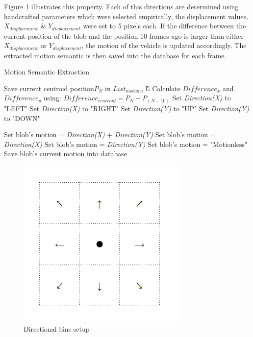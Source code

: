 Figure \ref{fig:cardinalbins} illustrates this property. Each of this directions are determined using handcrafted parameters which were selected empirically, the displacement values, $X_{displacement}$ \& $Y_{displacement}$ were set to 5 pixels each. If the difference between the current position of the blob and the position 10 frames ago is larger than either $X_{displacement}$ or $Y_{displacement}$, the motion of the vehicle is updated accordingly. The extracted motion semantic is then saved into the database for each frame. 


 \begin{algorithm}[!h]
	\caption{Motion Semantic Extraction}
	\label{algo:motion}
	\begin{algorithmic}[1]
		\State Save current centroid position$P_N$ in $List_{motion}$, \H{L} 
		\State Calculate $Difference_x$ and $Difference_y$ using:
		\State $Difference_{centroid} = P_N -P_{(N-10)}$
		\State Set \textit{Direction(X)} to "LEFT"
		\Else 
		\State Set \textit{Direction(X)} to "RIGHT"
		\EndIf
		\EndIf
		\State Set \textit{Direction(Y)} to "UP"
		\Else 
		\State Set \textit{Direction(Y)} to "DOWN"
		\EndIf
		\EndIf

		\State Set blob's motion = \textit{Direction(X)} + \textit{Direction(Y)}
		\Else 
		\State Set blob's motion = \textit{Direction(X) }
		\State Set blob's motion = \textit{Direction(Y)}
		\Else 
		\State Set blob's motion = "Motionless"
		\EndIf
		\EndIf
		\EndIf
		\State Save blob's current motion into database
		\EndFor
	\end{algorithmic}
\end{algorithm}

\begin{figure}[hbt!]\centering
\includegraphics[width=.5\textwidth]{image/motion.PNG}
\caption{Directional bins setup}
\label{fig:cardinalbins}
\end{figure}





